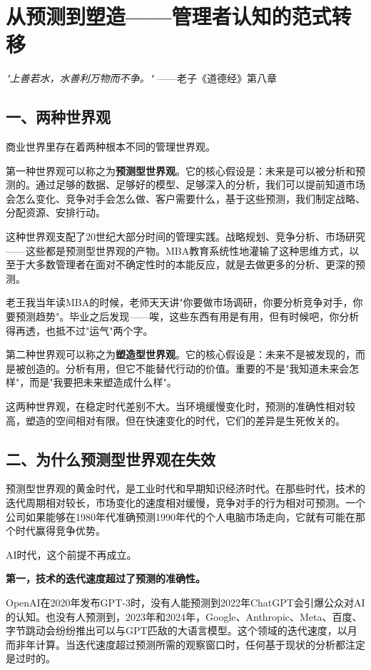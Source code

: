 \chapter{从预测到塑造——管理者认知的范式转移}


\textit{"上善若水，水善利万物而不争。"}
——老子《道德经》第八章


\section{一、两种世界观}


商业世界里存在着两种根本不同的管理世界观。

第一种世界观可以称之为\textbf{预测型世界观}。它的核心假设是：未来是可以被分析和预测的。通过足够的数据、足够好的模型、足够深入的分析，我们可以提前知道市场会怎么变化、竞争对手会怎么做、客户需要什么，基于这些预测，我们制定战略、分配资源、安排行动。

这种世界观支配了20世纪大部分时间的管理实践。战略规划、竞争分析、市场研究——这些都是预测型世界观的产物。MBA教育系统性地灌输了这种思维方式，以至于大多数管理者在面对不确定性时的本能反应，就是去做更多的分析、更深的预测。

老王我当年读MBA的时候，老师天天讲"你要做市场调研，你要分析竞争对手，你要预测趋势"。毕业之后发现——唉，这些东西有用是有用，但有时候吧，你分析得再透，也抵不过"运气"两个字。

第二种世界观可以称之为\textbf{塑造型世界观}。它的核心假设是：未来不是被发现的，而是被创造的。分析有用，但它不能替代行动的价值。重要的不是"我知道未来会怎样"，而是"我要把未来塑造成什么样"。

这两种世界观，在稳定时代差别不大。当环境缓慢变化时，预测的准确性相对较高，塑造的空间相对有限。但在快速变化的时代，它们的差异是生死攸关的。


\section{二、为什么预测型世界观在失效}


预测型世界观的黄金时代，是工业时代和早期知识经济时代。在那些时代，技术的迭代周期相对较长，市场变化的速度相对缓慢，竞争对手的行为相对可预测。一个公司如果能够在1980年代准确预测1990年代的个人电脑市场走向，它就有可能在那个时代赢得竞争优势。

AI时代，这个前提不再成立。

\textbf{第一，技术的迭代速度超过了预测的准确性。}

OpenAI在2020年发布GPT-3时，没有人能预测到2022年ChatGPT会引爆公众对AI的认知。也没有人预测到，2023年和2024年，Google、Anthropic、Meta、百度、字节跳动会纷纷推出可以与GPT匹敌的大语言模型。这个领域的迭代速度，以月而非年计算。当迭代速度超过预测所需的观察窗口时，任何基于现状的分析都注定是过时的。


